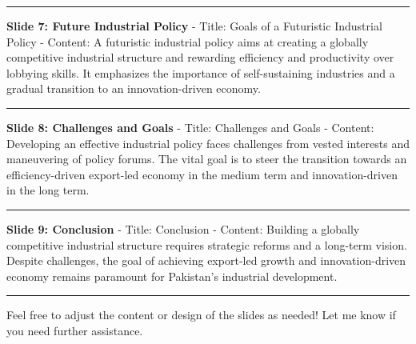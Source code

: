 \documentclass[
  letterpaper,
  DIV=11,
  numbers=noendperiod]{scrartcl}
\begin{document}
\begin{center}\rule{0.5\linewidth}{0.5pt}\end{center}

\textbf{Slide 7: Future Industrial Policy} - Title: Goals of a
Futuristic Industrial Policy - Content: A futuristic industrial policy
aims at creating a globally competitive industrial structure and
rewarding efficiency and productivity over lobbying skills. It
emphasizes the importance of self-sustaining industries and a gradual
transition to an innovation-driven economy.

\begin{center}\rule{0.5\linewidth}{0.5pt}\end{center}

\textbf{Slide 8: Challenges and Goals} - Title: Challenges and Goals -
Content: Developing an effective industrial policy faces challenges from
vested interests and maneuvering of policy forums. The vital goal is to
steer the transition towards an efficiency-driven export-led economy in
the medium term and innovation-driven in the long term.

\begin{center}\rule{0.5\linewidth}{0.5pt}\end{center}

\textbf{Slide 9: Conclusion} - Title: Conclusion - Content: Building a
globally competitive industrial structure requires strategic reforms and
a long-term vision. Despite challenges, the goal of achieving export-led
growth and innovation-driven economy remains paramount for Pakistan's
industrial development.

\begin{center}\rule{0.5\linewidth}{0.5pt}\end{center}

Feel free to adjust the content or design of the slides as needed! Let
me know if you need further assistance.
\end{document}
